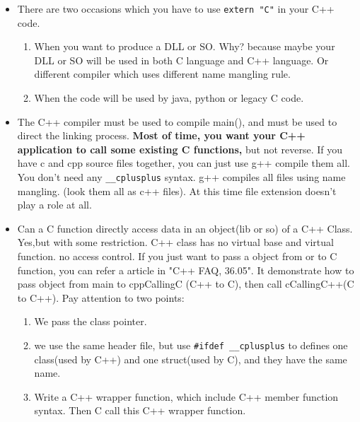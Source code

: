 \documentclass[a4paper,11pt,twoside]{book}
\begin{document}
\begin{itemize}
		\item There are two occasions which you have to use \texttt{extern "C"} in your C++ code. 
	\begin{enumerate}
		\item When you want to produce a DLL or SO. Why? because maybe your DLL or SO will be used in both C language and C++ language. Or different compiler which uses different name mangling rule.
		
		\item When the code will be used by java, python or legacy C code. 
	\end{enumerate}
	
        
	\item The C++ compiler must be used to compile main(), and must be used to direct the linking process. \textbf{Most of time, you want your C++ application to call some existing C functions,} but not reverse. If you have c and cpp source files together, you can just use g++ compile them all. You don't need any \texttt{\_\_cplusplus} syntax.  g++ compiles all files using name mangling. (look them all as c++ files). At this time file extension doesn't play a role at all.
	

	
	
	\item Can a C function directly access data in an object(lib or so) of a C++ Class. Yes,but with some restriction. C++ class has no virtual base and virtual function. no access control. If you just want to pass a object from or to C function, you can refer a article in "C++ FAQ, 36.05". It demonstrate how to pass object from main to cppCallingC (C++ to C), then call cCallingC++(C to C++). Pay attention to two points:
	\begin{enumerate}
		\item We pass the class pointer.
		\item we use the same header file, but use \texttt{\#ifdef \_\_cplusplus} to defines one class(used by C++) and one struct(used by C), and they have the same name.
		\item Write a C++ wrapper function, which include C++ member function syntax. Then C call this C++ wrapper function. 
	\end{enumerate}

\end{itemize}
\end{document}
